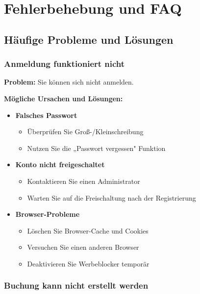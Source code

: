 \section{Fehlerbehebung und FAQ}
\label{sec:fehlerbehebung}

\subsection{Häufige Probleme und Lösungen}

\subsubsection{Anmeldung funktioniert nicht}

\textbf{Problem:} Sie können sich nicht anmelden.

\textbf{Mögliche Ursachen und Lösungen:}

\begin{itemize}
    \item \textbf{Falsches Passwort}
        \begin{itemize}
            \item Überprüfen Sie Groß-/Kleinschreibung
            \item Nutzen Sie die „Passwort vergessen" Funktion
        \end{itemize}
    \item \textbf{Konto nicht freigeschaltet}
        \begin{itemize}
            \item Kontaktieren Sie einen Administrator
            \item Warten Sie auf die Freischaltung nach der Registrierung
        \end{itemize}
    \item \textbf{Browser-Probleme}
        \begin{itemize}
            \item Löschen Sie Browser-Cache und Cookies
            \item Versuchen Sie einen anderen Browser
            \item Deaktivieren Sie Werbeblocker temporär
        \end{itemize}
\end{itemize}

\subsubsection{Buchung kann nicht erstellt werden}

